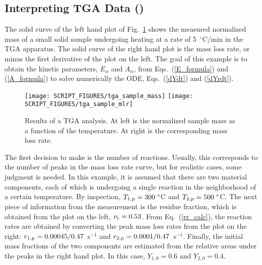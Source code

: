 \documentclass[11pt]{book}
\begin{document}
\subsection{Interpreting TGA Data (\texorpdfstring{}{tga\_sample})}
\label{tga_sample}

The solid curve of the left hand plot of Fig.~\ref{tga_sample_plot} shows the measured normalized mass of a small solid sample undergoing heating at a rate of 5~$^\circ$C/min in the TGA apparatus. The solid curve of the right hand plot is the mass loss rate, or minus the first derivative of the plot on the left. The goal of this example is to obtain the kinetic parameters, $E_\alpha$ and $A_\alpha$, from Eqs.~(\ref{E_formula}) and (\ref{A_formula}) to solve numerically the ODE, Eqs.~(\ref{dYdt}) and (\ref{dYrdt}).
\begin{figure}[!htb]
\texttt{[image: SCRIPT\_FIGURES/tga\_sample\_mass]}
\texttt{[image: SCRIPT\_FIGURES/tga\_sample\_mlr]}
\caption[Results of a TGA analysis]{Results of a TGA analysis. At left is the normalized sample mass as a function of the temperature. At right is the corresponding mass loss rate.}
\label{tga_sample_plot}
\end{figure}
The first decision to make is the number of reactions. Usually, this corresponds to the number of peaks in the mass loss rate curve, but for realistic cases, some judgment is needed. In this example, it is assumed that there are two material components, each of which is undergoing a single reaction in the neighborhood of a certain temperature. By inspection, $T_{1,{\rm p}}=300 \; ^\circ$C and $T_{2,{\rm p}}=500 \; ^\circ$C. The next piece of information from the measurement is the residue fraction, which is obtained from the plot on the left, $\nu_{\rm r}=0.53$. From Eq.~(\ref{rr_calc}), the reaction rates are obtained by converting the peak mass loss rates from the plot on the right: $r_{1,{\rm p}}=0.00045/0.47$~s$^{-1}$ and $r_{2,{\rm p}}=0.0001/0.47$~s$^{-1}$.  Finally, the initial mass fractions of the two components are estimated from the relative areas under the peaks in the right hand plot. In this case, $Y_{1,0}=0.6$ and $Y_{2,0}=0.4$.
\end{document}
